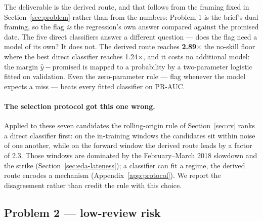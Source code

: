 The deliverable is the derived route, and that follows from the framing fixed in
Section~\ref{sec:problem} rather than from the numbers: Problem 1 is the brief's
dual framing, so the flag \emph{is} the regression's own answer compared against
the promised date. The five direct classifiers answer a different question ---
does the flag need a model of its own? It does not. The derived route reaches
\textbf{2.89$\times$} the no-skill floor where the best direct classifier reaches
1.24$\times$, and it costs no additional model: the margin
$\hat{y} - \text{promised}$ is mapped to a probability by a two-parameter
logistic \citep{platt1999probabilistic} fitted on validation. Even the
zero-parameter rule --- flag whenever the model expects a miss --- beats every
fitted classifier on PR-AUC.

\paragraph{The selection protocol got this one wrong.} Applied to these seven
candidates the rolling-origin rule of Section~\ref{sec:cv} ranks a direct
classifier first: on the in-training windows the candidates sit within noise of
one another, while on the forward window the derived route leads by a factor of
2.3. Those windows are dominated by the February--March 2018 slowdown and the
strike (Section~\ref{sec:eda-lateness}); a classifier can fit a regime, the
derived route encodes a mechanism (Appendix~\ref{app:protocol}). We report the
disagreement rather than credit the rule with this choice.

\subsection{Problem 2 --- low-review risk}
\label{sec:results-review}

